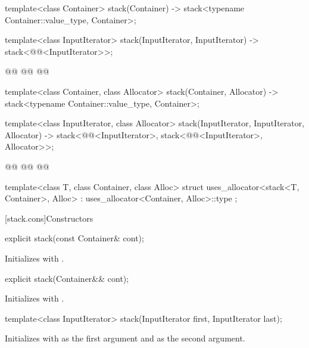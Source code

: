 \documentclass{wg21}
\begin{document}
\begin{codeblock}
{    template<class Container>
    stack(Container) -> stack<typename Container::value_type, Container>;

    template<class InputIterator>
    stack(InputIterator, InputIterator)
    -> stack<@@<InputIterator>>;

    @@
    @@
    @@

    template<class Container, class Allocator>
    stack(Container, Allocator) -> stack<typename Container::value_type, Container>;

    template<class InputIterator, class Allocator>
    stack(InputIterator, InputIterator, Allocator)
    -> stack<@@<InputIterator>,
    stack<@@<InputIterator>, Allocator>>;

    @@
    @@
    @@


    template<class T, class Container, class Alloc>
    struct uses_allocator<stack<T, Container>, Alloc>
    : uses_allocator<Container, Alloc>::type { };
}
\end{codeblock}

[stack.cons]{Constructors}

\begin{itemdecl}
    explicit stack(const Container& cont);
\end{itemdecl}

\begin{itemdescr}
    \pnum
    \effects Initializes  with .
\end{itemdescr}

\begin{itemdecl}
    explicit stack(Container&& cont);
\end{itemdecl}

\begin{itemdescr}
    \pnum
    \effects Initializes  with .
\end{itemdescr}

\begin{itemdecl}
    template<class InputIterator>
    stack(InputIterator first, InputIterator last);
\end{itemdecl}

\begin{itemdescr}
    \pnum
    \effects
    Initializes  with  as the first argument and  as the second argument.
\end{itemdescr}
\end{document}
